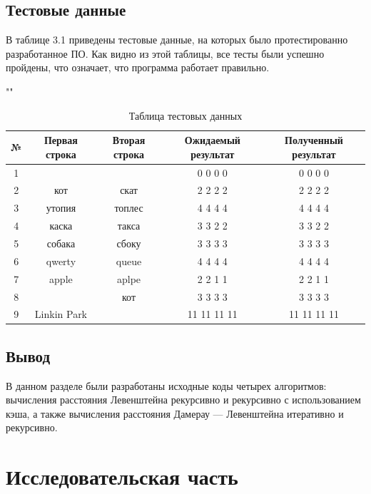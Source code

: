 \documentclass[12pt]{report}
\begin{document}
	\section{Тестовые данные}
	
	В таблице 3.1 приведены тестовые данные, на которых было протестированно разработанное ПО. Как видно из этой таблицы, все тесты были успешно пройдены, что означает, что программа работает правильно.
	
	\begin{table}[h]
		\begin{center}
			\caption{Таблица тестовых данных}
			""\newline
			\begin{tabular}{|c c c c c|} 
				\hline
				№ & Первая строка & Вторая строка & Ожидаемый результат & Полученный результат \\ [0.8ex] 
				\hline
				1 &  &  & 0 0 0 0 & 0 0 0 0\\
				\hline
				2 & кот & скат & 2 2 2 2 & 2 2 2 2\\
				\hline
				3 & утопия & топлес & 4 4 4 4 & 4 4 4 4\\
				\hline
				4 & каска & такса & 3 3 2 2 & 3 3 2 2\\
				\hline
				5 & собака & сбоку & 3 3 3 3 & 3 3 3 3\\
				\hline
				6 & qwerty & queue & 4 4 4 4 & 4 4 4 4\\
				\hline
				7 & apple & aplpe & 2 2 1 1  & 2 2 1 1\\
				\hline
				8 &  & кот & 3 3 3 3 & 3 3 3 3\\
				\hline
				9 & Linkin Park &  & 11 11 11 11 & 11 11 11 11\\
				\hline
			\end{tabular}
		\end{center}
	\end{table}
	
	\section{Вывод}
	В данном разделе были разработаны исходные коды четырех алгоритмов: вычисления расстояния Левенштейна рекурсивно и рекурсивно с использованием кэша, а также вычисления расстояния Дамерау — Левенштейна итеративно и рекурсивно.
	
	\chapter{Исследовательская часть}
	
\end{document}
